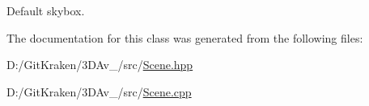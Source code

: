 Default skybox. 



The documentation for this class was generated from the following files\+:\begin{DoxyCompactItemize}
\item 
D\+:/\+Git\+Kraken/3\+D\+Av\+\_/src/\mbox{\hyperlink{_scene_8hpp}{Scene.\+hpp}}\item 
D\+:/\+Git\+Kraken/3\+D\+Av\+\_/src/\mbox{\hyperlink{_scene_8cpp}{Scene.\+cpp}}\end{DoxyCompactItemize}
